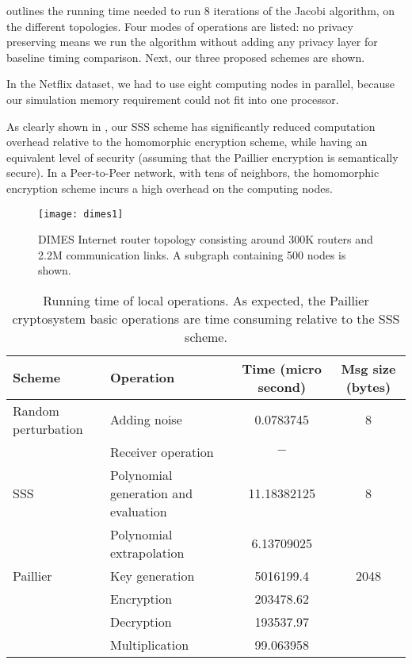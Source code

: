 \documentclass[10pt]{svjour3}
\begin{document}
 outlines the running time needed to run 8 iterations of
the Jacobi algorithm, on the different topologies. Four modes of
operations are listed: no privacy preserving means we run the
algorithm without adding any privacy layer for baseline timing
comparison. Next, our three proposed schemes are shown.

In the Netflix dataset, we had to use eight computing nodes in
parallel, because our simulation memory requirement could not fit
into one processor.

As clearly shown in , our SSS scheme has significantly
reduced computation overhead relative to the homomorphic
encryption scheme, while having an equivalent level of security
(assuming that the Paillier encryption is semantically secure). In
a Peer-to-Peer network, with tens of neighbors, the homomorphic
encryption scheme incurs a high overhead on the computing nodes.


\begin{figure}
\texttt{[image: dimes1]}\\
  \caption{DIMES Internet router topology consisting around 300K routers and 2.2M communication links. A subgraph containing 500 nodes is shown.}\label{fig:DIMES}
\end{figure}


\begin{table*}[t!]
  \centering
\begin{tabular}{|l|l|c|c|}
\hline
  Scheme & Operation & Time (micro second) & Msg size (bytes)\\ \hline
  Random perturbation & Adding noise & 0.0783745  & 8\\
                     & Receiver operation & $-$ &\\ \hline
  SSS & Polynomial generation and evaluation & 11.18382125 & 8 \\
          & Polynomial extrapolation & 6.13709025 & \\ \hline
  Paillier & Key generation & 5016199.4 & 2048\\
      & Encryption & 203478.62  &\\
 & Decryption & 193537.97   &\\
        & Multiplication & 99.063958 & \\
   \hline
\end{tabular}
  \label{local}
  \caption{Running time of local operations. As expected, the Paillier cryptosystem basic operations
  are time consuming relative to the SSS scheme.}\label{tb2}
\end{table*}
\end{document}
